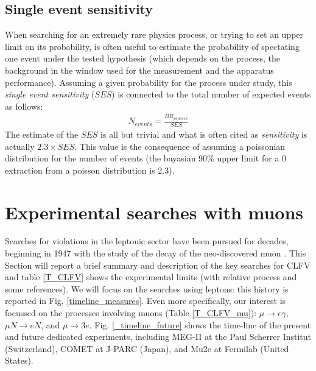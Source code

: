 \documentclass[12pt,a4paper,openright, oneside, titlepage]{book} %
\begin{document}
\subsection{Single event sensitivity}
When searching for an extremely rare physics process, 
or trying to set an upper limit on its probability, 
is often useful to estimate the probability of spectating one event 
under the tested hypothesis 
(which depends on the process, the background in the window used for the measurement 
and the apparatus performance). 
Assuming a given probability for the process under study, 
this \textit{single event sensitivity} ($SES$) is connected to the total number of expected events as follows:
\begin{align*}
N_{events} = \frac{BR_{process}}{SES}
\end{align*}
The estimate of the $SES$ is all but trivial 
and what is often cited as \textit{sensitivity} is actually $2.3\times SES$. 
This value is the consequence of assuming a poissonian distribution 
for the number of events (the bayasian 90\% upper limit for a 0 extraction from a poisson distribution is 2.3).\\

\section{Experimental searches with muons}
Searches for violations in the leptonic sector have been pursued for decades, 
beginning in 1947 \cite{ConvPancPicc} with the study of the decay of the neo-discovered muon \cite{Anderson}.
This Section will report a brief summary and description 
of the key searches for CLFV and table \ref{T_CLFV} shows the experimental limits 
(with relative process and some references). 
We will focus on the searches using leptons: 
this history is reported in  Fig. \ref{timeline_measures}. 
Even more specifically, our interest is focussed on the processes involving muons 
(Table \ref{T_CLFV_mu}): $\mu\rightarrow e\gamma$, $\mu N\rightarrow e N$, and $\mu\rightarrow 3e$.
Fig. \ref{_timeline_future} shows the time-line of the present and future dedicated experiments,
including MEG-II at the Paul Scherrer Institut (Switzerland), COMET at J-PARC (Japan),
and Mu2e at Fermilab (United States).
\end{document}
